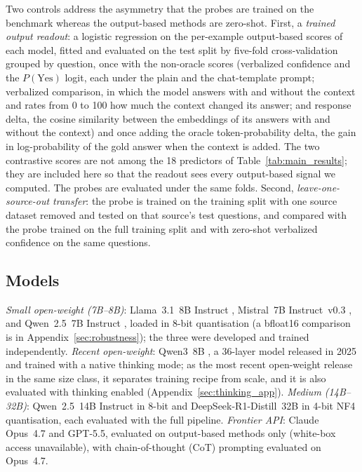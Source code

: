 \documentclass[acmsmall,screen,review]{acmart}
\begin{document}
Two controls address the asymmetry that the probes are trained on the benchmark whereas the output-based methods are zero-shot. First, a \emph{trained output readout}: a logistic regression on the per-example output-based scores of each model, fitted and evaluated on the test split by five-fold cross-validation grouped by question, once with the non-oracle scores (verbalized confidence and the $P(\text{Yes})$ logit, each under the plain and the chat-template prompt; verbalized comparison, in which the model answers with and without the context and rates from 0 to 100 how much the context changed its answer; and response delta, the cosine similarity between the embeddings of its answers with and without the context) and once adding the oracle token-probability delta, the gain in log-probability of the gold answer when the context is added. The two contrastive scores are not among the 18 predictors of Table~\ref{tab:main_results}; they are included here so that the readout sees every output-based signal we computed. The probes are evaluated under the same folds. Second, \emph{leave-one-source-out transfer}: the probe is trained on the training split with one source dataset removed and tested on that source's test questions, and compared with the probe trained on the full training split and with zero-shot verbalized confidence on the same questions.

\subsection{Models}
\label{sec:models}

\textit{Small open-weight (7B--8B)}: Llama~3.1~8B Instruct \citep{grattafiori2024llama}, Mistral~7B Instruct~v0.3 \citep{jiang2023mistral}, and Qwen~2.5~7B Instruct \citep{qwen2024}, loaded in 8-bit quantisation (a bfloat16 comparison is in Appendix~\ref{sec:robustness}); the three were developed and trained independently. \textit{Recent open-weight}: Qwen3~8B \citep{qwen3}, a 36-layer model released in 2025 and trained with a native thinking mode; as the most recent open-weight release in the same size class, it separates training recipe from scale, and it is also evaluated with thinking enabled (Appendix~\ref{sec:thinking_app}). \textit{Medium (14B--32B)}: Qwen~2.5~14B Instruct \citep{qwen2024} in 8-bit and DeepSeek-R1-Distill~32B \citep{deepseekai2025r1} in 4-bit NF4 quantisation, each evaluated with the full pipeline. \textit{Frontier API}: Claude Opus~4.7 and GPT-5.5, evaluated on output-based methods only (white-box access unavailable), with chain-of-thought (CoT) prompting evaluated on Opus~4.7.
\end{document}
